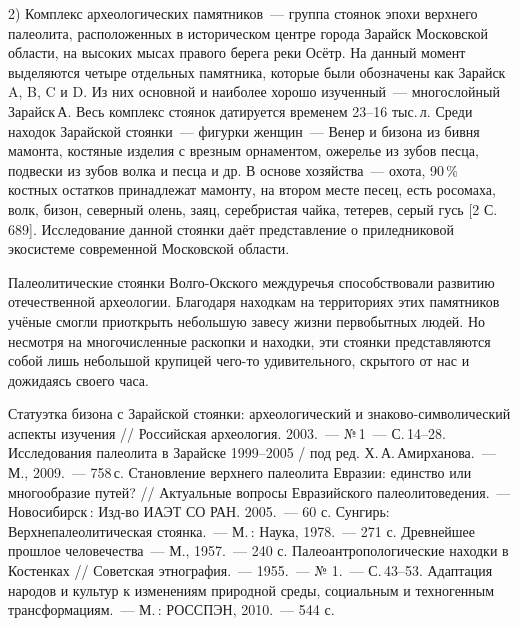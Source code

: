 2) Комплекс археологических памятников~--- группа стоянок эпохи верхнего палеолита, расположенных в историческом центре города Зарайск Московской области, на высоких мысах правого берега реки Осётр. На данный момент выделяются четыре отдельных памятника, которые были обозначены как Зарайск A, B, C и D. Из них основной и наиболее хорошо изученный~--- многослойный Зарайск\,А. Весь комплекс стоянок датируется временем 23--16 тыс.\,л. Среди находок Зарайской стоянки~--- фигурки женщин~--- Венер и бизона из бивня мамонта, костяные изделия с врезным орнаментом, ожерелье из зубов песца, подвески из зубов волка и песца и др. В основе хозяйства~--- охота, 90\,\% костных остатков принадлежат мамонту, на втором месте песец, есть росомаха, волк, бизон, северный олень, заяц, серебристая чайка, тетерев, серый гусь [2 С.\,689]. Исследование данной стоянки даёт представление о приледниковой экосистеме современной Московской области.

Палеолитические стоянки Волго-Окского междуречья способствовали развитию отечественной археологии. Благодаря находкам на территориях этих памятников учёные смогли приоткрыть небольшую завесу жизни первобытных людей. Но несмотря на многочисленные раскопки и находки, эти стоянки представляются собой лишь небольшой крупицей чего-то удивительного, скрытого от нас и дожидаясь своего часа.

\begin{thebibliography}{99}
\bibitem{} Статуэтка бизона с Зарайской стоянки: археологический и знаково-символический аспекты изучения // Российская археология. 2003.~--- №\,1~--- С.\,14--28.
\bibitem{} Исследования палеолита в Зарайске 1999--2005 / под ред. Х.\,А.\,Амирханова.~--- М., 2009.~--- 758\,с.
\bibitem{} Становление верхнего палеолита Евразии: единство или многообразие путей? // Актуальные вопросы Евразийского палеолитоведения.~--- Новосибирск\,: Изд-во ИАЭТ СО РАН. 2005.~--- 60 с.
\bibitem{} Сунгирь: Верхнепалеолитическая стоянка.~--- М.\,: Наука, 1978.~--- 271 с.
\bibitem{} Древнейшее прошлое человечества~--- М., 1957.~--- 240 с.
\bibitem{} Палеоантропологические находки в Костенках // Советская этнография.~--- 1955.~--- № 1.~--- С.\,43--53.
\bibitem{}  Адаптация народов и культур к изменениям природной среды, социальным и техногенным трансформациям.~--- М.\,: РОССПЭН, 2010.~--- 544 с.

\end{thebibliography}
\thispagestyle{empty}
